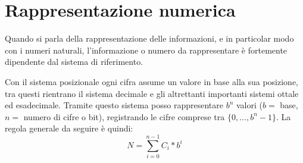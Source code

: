 \section{Rappresentazione numerica}
Quando si parla della rappresentazione delle informazioni, e in particolar modo con i numeri naturali, l'informazione o numero da rappresentare è fortemente dipendente dal sistema di riferimento.

Con il sistema posizionale ogni cifra assume un valore in base alla sua posizione, tra questi rientrano il sistema decimale e gli altrettanti importanti sistemi ottale ed esadecimale.
Tramite questo sistema posso rappresentare $b^n$ valori ($b =$ base, $n =$ numero di cifre o bit), registrando le cifre comprese tra $\{0,...,b^n-1\}$. La regola generale da seguire è quindi:
\begin{equation}
    N=\sum_{i=0}^{n-1}C_i*b^i
\end{equation}


